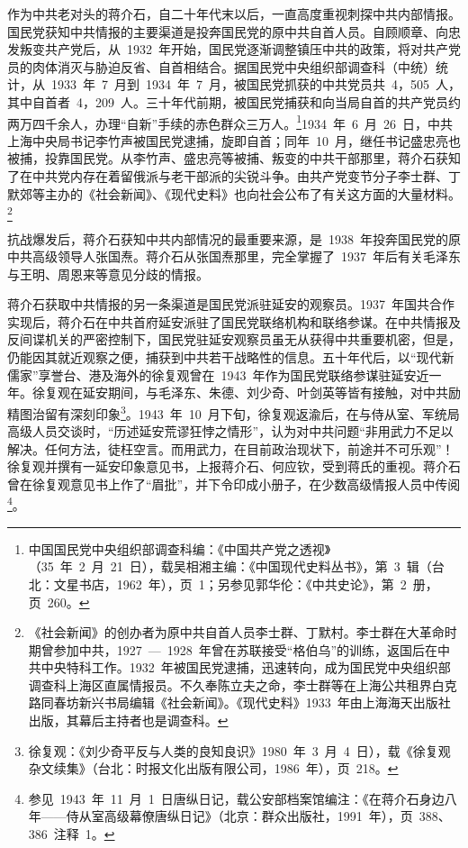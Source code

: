 作为中共老对头的蒋介石，自二十年代末以后，一直高度重视刺探中共内部情报。国民党获知中共情报的主要渠道是投奔国民党的原中共自首人员。自顾顺章、向忠发叛变共产党后，从~1932~年开始，国民党逐渐调整镇压中共的政策，将对共产党员的肉体消灭与胁迫反省、自首相结合。据国民党中央组织部调查科（中统）统计，从~1933~年~7~月到~1934~年~7~月，被国民党抓获的中共党员共~4，505~人，其中自首者~4，209~人。三十年代前期，被国民党捕获和向当局自首的共产党员约两万四千余人，办理“自新”手续的赤色群众三万人。\footnote{中国国民党中央组织部调查科编：《中国共产党之透视》（35~年~2~月~21~日），载吴相湘主编：《中国现代史料丛书》，第~3~辑（台北：文星书店，1962~年），页~1；另参见郭华伦：《中共史论》，第~2~册，页~260。}1934~年~6~月~26~日，中共上海中央局书记李竹声被国民党逮捕，旋即自首；同年~10~月，继任书记盛忠亮也被捕，投靠国民党。从李竹声、盛忠亮等被捕、叛变的中共干部那里，蒋介石获知了在中共党内存在着留俄派与老干部派的尖锐斗争。由共产党变节分子李士群、丁默郊等主办的《社会新闻》、《现代史料》也向社会公布了有关这方面的大量材料。\footnote{《社会新闻》的创办者为原中共自首人员李士群、丁默村。李士群在大革命时期曾参加中共，1927~—~1928~年曾在苏联接受“格伯乌”的训练，返国后在中共中央特科工作。1932~年被国民党逮捕，迅速转向，成为国民党中央组织部调查科上海区直属情报员。不久奉陈立夫之命，李士群等在上海公共租界白克路同春坊新兴书局编辑《社会新闻》。《现代史料》1933~年由上海海天出版社出版，其幕后主持者也是调查科。}

抗战爆发后，蒋介石获知中共内部情况的最重要来源，是~1938~年投奔国民党的原中共高级领导人张国焘。蒋介石从张国焘那里，完全掌握了~1937~年后有关毛泽东与王明、周恩来等意见分歧的情报。

蒋介石获取中共情报的另一条渠道是国民党派驻延安的观察员。1937~年国共合作实现后，蒋介石在中共首府延安派驻了国民党联络机构和联络参谋。在中共情报及反间谍机关的严密控制下，国民党驻延安观察员虽无从获得中共重要机密，但是，仍能因其就近观察之便，捕获到中共若干战略性的信息。五十年代后，以“现代新儒家”享誉台、港及海外的徐复观曾在~1943~年作为国民党联络参谋驻延安近一年。徐复观在延安期间，与毛泽东、朱德、刘少奇、叶剑英等皆有接触，对中共励精图治留有深刻印象\footnote{徐复观：《刘少奇平反与人类的良知良识》1980~年~3~月~4~日），载《徐复观杂文续集》（台北：时报文化出版有限公司，1986~年），页~218。}。1943~年~10~月下旬，徐复观返渝后，在与侍从室、军统局高级人员交谈时，“历述延安荒谬狂悖之情形”，认为对中共问题“非用武力不足以解决。任何方法，徒枉空言。而用武力，在目前政治现状下，前途并不可乐观”！徐复观并撰有一延安印象意见书，上报蒋介石、何应钦，受到蒋氏的重视。蒋介石曾在徐复观意见书上作了“眉批”，并下令印成小册子，在少数高级情报人员中传阅\footnote{参见~1943~年~11~月~1~日唐纵日记，载公安部档案馆编注：《在蒋介石身边八年——侍从室高级幕僚唐纵日记》（北京：群众出版社，1991~年），页~388、386~注释~1。}。

